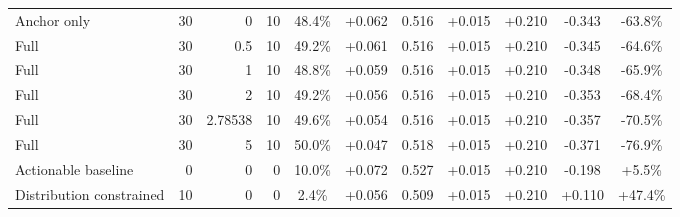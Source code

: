 \begin{table}[htbp]
\begin{tabular}{lrrrccccccc}
Anchor only & 30 & 0 & 10 & 48.4\% & +0.062 & 0.516 & +0.015 & +0.210 & -0.343 & -63.8\% \\
Full & 30 & 0.5 & 10 & 49.2\% & +0.061 & 0.516 & +0.015 & +0.210 & -0.345 & -64.6\% \\
Full & 30 & 1 & 10 & 48.8\% & +0.059 & 0.516 & +0.015 & +0.210 & -0.348 & -65.9\% \\
Full & 30 & 2 & 10 & 49.2\% & +0.056 & 0.516 & +0.015 & +0.210 & -0.353 & -68.4\% \\
Full & 30 & 2.78538 & 10 & 49.6\% & +0.054 & 0.516 & +0.015 & +0.210 & -0.357 & -70.5\% \\
Full & 30 & 5 & 10 & 50.0\% & +0.047 & 0.518 & +0.015 & +0.210 & -0.371 & -76.9\% \\
Actionable baseline & 0 & 0 & 0 & 10.0\% & +0.072 & 0.527 & +0.015 & +0.210 & -0.198 & +5.5\% \\
Distribution constrained & 10 & 0 & 0 & 2.4\% & +0.056 & 0.509 & +0.015 & +0.210 & +0.110 & +47.4\% \\
\bottomrule
\end{tabular}
\end{table}